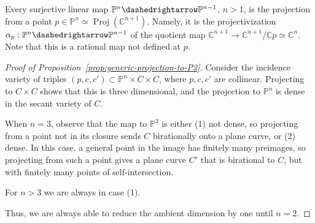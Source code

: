 \documentclass[12pt]{amsart}
\theoremstyle{definition}
\begin{document}
Every surjective linear map ${{\mathbb{P}}}^n{\dashedrightarrow} {{\mathbb{P}}}^{n-1}$, $n>1$, is the projection from a point
$p\in{{\mathbb{P}}}^n\simeq \operatorname{Proj}({{\mathbb{C}}}^{n+1})$.
Namely, it is the projectivization $\alpha_p: {{\mathbb{P}}}^n{\dashedrightarrow} {{\mathbb{P}}}^{n-1}$ of the quotient map
${{\mathbb{C}}}^{n+1}\to{{\mathbb{C}}}^{n+1}/{{\mathbb{C}}} p \simeq{{\mathbb{C}}}^n$.
Note that this is a rational map not defined at $p$.

\begin{proof}[Proof of Proposition~\ref{prop:generic-projection-to-P2}]
Consider the incidence variety of triples
$(p,c,c')\subset {{\mathbb{P}}}^n \times C\times C$, where
$p, c, c'$ are collinear.   Projecting to
$C\times C$ shows that this is three dimensional,
and the projection to ${{\mathbb{P}}}^n$ is dense in the secant variety of $C$.

When $n=3$, observe that the map to ${{\mathbb{P}}}^3$ is either
(1) not dense, so projecting from a point not in
     its closure sends $C$ birationally onto a plane
     curve, or
(2) dense.  In this case, a general point in the
     image has finitely many preimages, so projecting
     from such a point gives a plane curve $C'$ that
     is birational to $C$, but with finitely many
     points of self-intersection.

For $n>3$ we are always in case (1).

Thus, we are always able to reduce the ambient dimension by one until $n=2$.
\end{proof}
\end{document}
